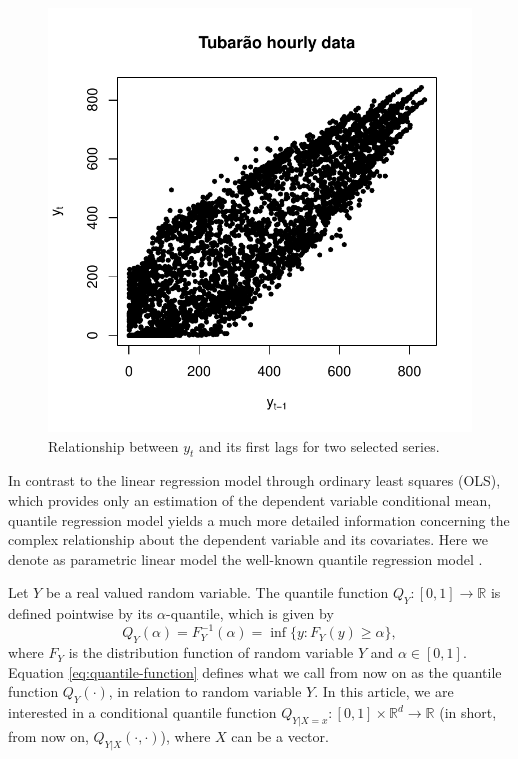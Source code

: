 \begin{figure}
\begin{minipage}[t]{\linewidth}
\begin{minipage}[t]{0.45\linewidth}
      \centering     \includegraphics[width=\textwidth]{Figuras/Solar-exemplos/scatterplot}
    \end{minipage}
  \end{minipage}
  \caption{Relationship between $y_t$ and its first lags for two selected series.}
  \label{fig:scatterplot-1lag}
\end{figure}

In contrast to the linear regression model through ordinary least squares (OLS), which provides only an estimation of the dependent variable conditional mean, quantile regression model yields a much more detailed information concerning the complex relationship about the dependent variable and its covariates. Here we denote as parametric linear model the well-known quantile regression model \cite{koenker2005quantile}.

Let $Y$ be a real valued random variable. The quantile function $Q_Y:[0,1] \rightarrow \mathbb{R}$ is defined pointwise by its $\alpha$-quantile, which is given by
\begin{equation}
Q_Y(\alpha) = F_Y^{-1}(\alpha) = \inf\{y: F_Y(y) \geq \alpha\},
\label{eq:quantile-function}
\end{equation}
where $F_Y$ is the distribution function of random variable $Y$ and $\alpha \in [0,1]$. Equation \ref{eq:quantile-function} defines what we call from now on as the quantile function $Q_Y(\cdot)$, in relation to random variable $Y$. In this article, we are interested in a conditional quantile function $Q_{Y|X=x}:[0,1] \times \mathbb{R}^d \rightarrow \mathbb{R}$ (in short, from now on, $Q_{Y|X}(\cdot, \cdot)$), where $X$ can be a vector.

